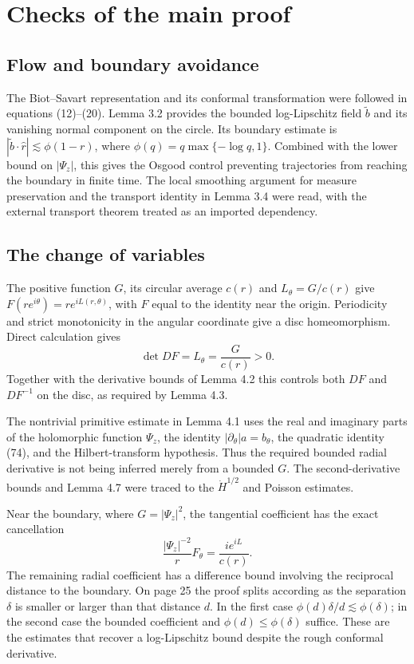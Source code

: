 \documentclass[10pt]{article}
\begin{document}
\section*{Checks of the main proof}
\subsection*{Flow and boundary avoidance}
The Biot–Savart representation and its conformal transformation were followed in equations (12)–(20). Lemma 3.2 provides the bounded log-Lipschitz field \(\widetilde b\) and its vanishing normal component on the circle. Its boundary estimate is \(|\widetilde b\cdot\widehat r|\lesssim\phi(1-r)\), where \(\phi(q)=q\max\{-\log q,1\}\). Combined with the lower bound on \(|\Psi_z|\), this gives the Osgood control preventing trajectories from reaching the boundary in finite time. The local smoothing argument for measure preservation and the transport identity in Lemma 3.4 were read, with the external transport theorem treated as an imported dependency.\par
\subsection*{The change of variables}
The positive function \(G\), its circular average \(c(r)\) and \(L_\theta=G/c(r)\) give \(F(re^{i\theta})=re^{iL(r,\theta)}\), with \(F\) equal to the identity near the origin. Periodicity and strict monotonicity in the angular coordinate give a disc homeomorphism. Direct calculation gives \[\det DF=L_\theta=\frac{G}{c(r)}>0 .\] Together with the derivative bounds of Lemma 4.2 this controls both \(DF\) and \(DF^{-1}\) on the disc, as required by Lemma 4.3.\par
The nontrivial primitive estimate in Lemma 4.1 uses the real and imaginary parts of the holomorphic function \(\Psi_z\), the identity \(|\partial_\theta|a=b_\theta\), the quadratic identity (74), and the Hilbert-transform hypothesis. Thus the required bounded radial derivative is not being inferred merely from a bounded \(G\). The second-derivative bounds and Lemma 4.7 were traced to the \(\dot H^{1/2}\) and Poisson estimates.\par
Near the boundary, where \(G=|\Psi_z|^2\), the tangential coefficient has the exact cancellation \[\frac{|\Psi_z|^{-2}}{r}F_\theta
 =\frac{i e^{iL}}{c(r)} .\] The remaining radial coefficient has a difference bound involving the reciprocal distance to the boundary. On page 25 the proof splits according as the separation \(\delta\) is smaller or larger than that distance \(d\). In the first case \(\phi(d)\delta/d\lesssim\phi(\delta)\); in the second case the bounded coefficient and \(\phi(d)\leq\phi(\delta)\) suffice. These are the estimates that recover a log-Lipschitz bound despite the rough conformal derivative.\par
\end{document}
